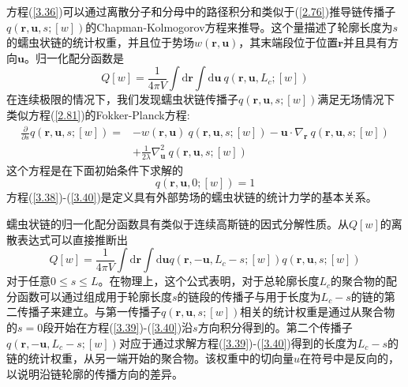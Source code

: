 方程(\ref{3.36})可以通过离散分子和分母中的路径积分和类似于(\ref{2.76})推导链传播子$q(\mathbf{r},\mathbf{u},s;[w])$的Chapman-Kolmogorov方程来推导。这个量描述了轮廓长度为$s$的蠕虫状链的统计权重，并且位于势场$w(\mathbf{r},\mathbf{u})$，其末端段位于位置$\mathbf{r}$并且具有方向$\mathbf{u}$。归一化配分函数是
\begin{equation}\label{3.38}
Q[w]=\frac{1}{4\pi V}\int\mathrm{d}\mathbf{r}\int\mathrm{d}\mathbf{u}~q(\mathbf{r},\mathbf{u},L_c;[w])
\end{equation}
在连续极限的情况下，我们发现蠕虫状链传播子$q(\mathbf{r},\mathbf{u},s;[w])$满足无场情况下类似方程(\ref{2.81})的Fokker-Planck方程:
\begin{equation}\label{3.39}
\begin{aligned}
\frac{\partial}{\partial s}q(\mathbf{r},\mathbf{u},s;[w])=&-w(\mathbf{r},\mathbf{u})~q(\mathbf{r},\mathbf{u},s;[w])-\mathbf{u}\cdot\nabla_{\mathbf{r}}~q(\mathbf{r},\mathbf{u},s;[w])\\
&+\frac{1}{2\lambda}\nabla_{\mathbf{u}}^2~q(\mathbf{r},\mathbf{u},s;[w])
\end{aligned}
\end{equation}
这个方程是在下面初始条件下求解的
\begin{equation}\label{3.40}
q(\mathbf{r},\mathbf{u},0;[w])=1
\end{equation}
方程(\ref{3.38})-(\ref{3.40})是定义具有外部势场的蠕虫状链的统计力学的基本关系。

蠕虫状链的归一化配分函数具有类似于连续高斯链的因式分解性质。从$Q[w]$的离散表达式可以直接推断出
\begin{equation}\label{3.41}
Q[w]=\frac{1}{4\pi V}\int\mathrm{d}\mathbf{r}\int\mathrm{d}\mathbf{u}q(\mathbf{r},-\mathbf{u},L_c-s;[w])q(\mathbf{r},\mathbf{u},s;[w])
\end{equation}
对于任意$0\le s\le L$。在物理上，这个公式表明，对于总轮廓长度$L_c$的聚合物的配分函数可以通过组成用于轮廓长度$s$的链段的传播子与用于长度为$L_c-s$的链的第二传播子来建立。与第一传播子$q(\mathbf{r},\mathbf{u},s;[w])$相关的统计权重是通过从聚合物的$s=0$段开始在方程(\ref{3.39})-(\ref{3.40})沿$s$方向积分得到的。第二个传播子$q(\mathbf{r},-\mathbf{u},L_c-s;[w])$对应于通过求解方程(\ref{3.39})-(\ref{3.40})得到的长度为$L_c-s$的链的统计权重，从另一端开始的聚合物。该权重中的切向量$u$在符号中是反向的，以说明沿链轮廓的传播方向的差异。

